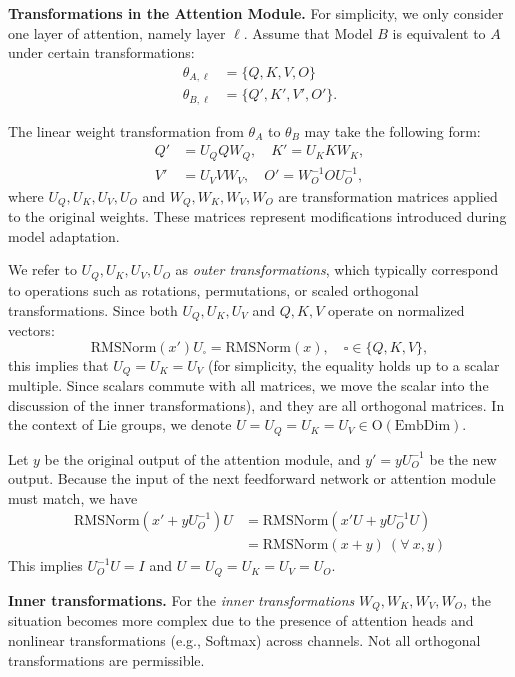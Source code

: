 \documentclass{article} %
\begin{document}
\textbf{Transformations in the Attention Module.} For simplicity, we only consider one layer of attention, namely layer $\ell$. Assume that Model $B$ is equivalent to $A$ under certain transformations:
\[
\begin{aligned}
\theta_{A,\ell} &= \{ Q, K, V, O \} \\
\theta_{B,\ell} &= \{ Q', K', V', O' \}.
\end{aligned}
\]

The linear weight transformation from $\theta_A$ to $\theta_B$ may take the following form:
\[
\begin{aligned}
Q' &= U_Q Q W_Q, \quad K' = U_K K W_K, \\
V' &= U_V V W_V, \quad O' = W_O^{-1} O U_O^{-1},
\end{aligned}
\]
where $U_Q, U_K, U_V, U_O$ and $W_Q, W_K, W_V, W_O$ are transformation matrices applied to the original weights. These matrices represent modifications introduced during model adaptation.  

We refer to $U_Q, U_K, U_V, U_O$ as \textit{outer transformations}, which typically correspond to operations such as rotations, permutations, or scaled orthogonal transformations.  
Since both $U_Q, U_K, U_V$ and $Q, K, V$ operate on normalized vectors:
\[
\mathrm{RMSNorm}(x') U_\square = \mathrm{RMSNorm}(x), \quad \square \in \{ Q, K, V \},
\]
this implies that $U_Q = U_K = U_V$ (for simplicity, the equality holds up to a scalar multiple. Since scalars commute with all matrices, we move the scalar into the discussion of the inner transformations), and they are all orthogonal matrices. In the context of Lie groups, we denote $U = U_Q = U_K = U_V \in \mathrm{O}(\mathrm{EmbDim})$. 

Let $y$ be the original output of the attention module, and $y' = y U_O^{-1}$ be the new output. Because the input of the next feedforward network or attention module must match, we have
\[
\begin{aligned}
\mathrm{RMSNorm}(x'+y U_O^{-1}) U 
&= \mathrm{RMSNorm}(x'U+y U_O^{-1}U) \\
&= \mathrm{RMSNorm}(x+y) \ (\forall \ x, y)
\end{aligned}
\]
This implies $U_O^{-1}U = I$ and $U = U_Q = U_K = U_V =U_O$.



\textbf{Inner transformations.} For the \textit{inner transformations} $W_Q, W_K, W_V, W_O$, the situation becomes more complex due to the presence of attention heads and nonlinear transformations (e.g., Softmax) across channels.  
Not all orthogonal transformations are permissible.
\end{document}
